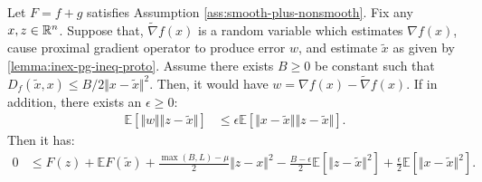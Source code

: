 \documentclass[12pt]{article}
\newcommand{\expect}{\ensuremath{\mathbb E}}
\begin{document}
        \begin{lemma}\label{lemma:stoch-pg-ineq}
            Let $F = f + g$ satisfies Assumption \ref{ass:smooth-plus-nonsmooth}. 
            Fix any $x, z \in \mathbb R^n$. 
            Suppose that, $\tilde \nabla f(x)$ is a random variable which estimates $\nabla f(x)$, cause proximal gradient operator to produce error $w$, and estimate $\tilde x$ as given by \ref{lemma:inex-pg-ineq-proto}. 
            Assume there exists $B \ge 0$ be constant such that $D_f(\tilde x,x)\le B/2 \Vert x - \tilde x\Vert^2$. 
            Then, it would have $w = \nabla f(x) - \tilde \nabla f(x)$. 
            If in addition, there exists an $\epsilon \ge 0$: 
            \begin{align*}
                \expect \left[
                    \Vert w\Vert \Vert z - \tilde x\Vert
                \right] &\le 
                \epsilon \expect \left[
                    \Vert x - \tilde x\Vert\Vert z - \tilde x\Vert
                \right]. 
            \end{align*}
            Then it has: 
            \begin{align*}
                0 &\le 
                F(z) + \expect F(\tilde x) + \frac{\max(B, L) - \mu}{2} \Vert z - x\Vert^2
                - \frac{B - \epsilon}{2}\expect\left[\Vert z - \tilde x\Vert^2\right]
                + \frac{\epsilon}{2} \expect\left[\Vert x - \tilde x\Vert^2\right]. 
            \end{align*}
        \end{lemma}
\end{document}

